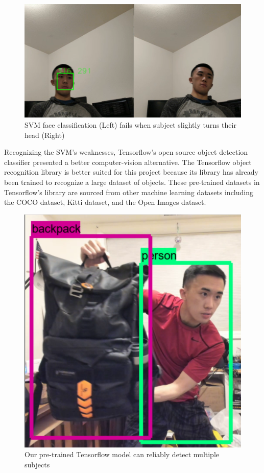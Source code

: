 \documentclass[onecolumn, draftclsnofoot,10pt, compsoc]{IEEEtran}
\makeatletter
\newcommand\captionof[1]{\def\@captype{#1}\caption}
\makeatother
\begin{document}
\begin{singlespace}
			\begin{figure}[H]
			\includegraphics[scale=0.60]{svm.PNG}
			\captionof{figure}{SVM face classification (Left) fails when subject slightly turns their head (Right)}
			\label{svm}
			\end{figure}


			Recognizing the SVM's weaknesses, Tensorflow's open source object detection classifier presented a better computer-vision alternative. \cite{tensorflow}
			The Tensorflow object recognition library is better suited for this project because its library has already been trained to recognize a large dataset of objects. \cite{convolutional_object_detectors}
			These pre-trained datasets in Tensorflow's library are sourced from other machine learning datasets including the COCO dataset, Kitti dataset, and the Open Images dataset. \cite{coco} \cite{open_images} \cite{kitti}


			\begin{figure}[H]
			\includegraphics[scale=0.45]{tensorflow.PNG}
			\captionof{figure}{Our pre-trained Tensorflow model can reliably detect multiple subjects}
			\label{tf-detect}
			\end{figure}



\end{singlespace}
\end{document}
